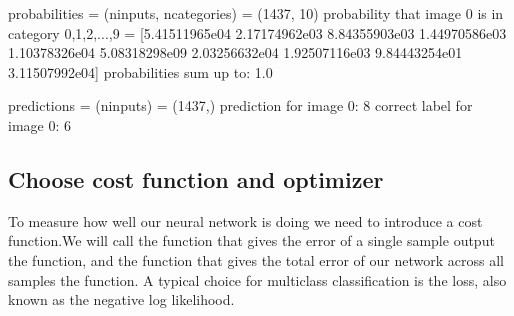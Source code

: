 \documentclass[letterpaper,10pt,english]{sphinxmanual}
\begin{document}
\begin{sphinxVerbatim}[commandchars=\\\{\}]
 
      
      

  
  
  \PYG{p}{[}\PYG{p}{]}
  \PYG{p}{[}\PYG{p}{]}
\end{sphinxVerbatim}

\begin{sphinxVerbatim}[commandchars=\\\{\}]
probabilities = (n\PYGZus{}inputs, n\PYGZus{}categories) = (1437, 10)
probability that image 0 is in category 0,1,2,...,9 = 
[5.41511965e\PYGZhy{}04 2.17174962e\PYGZhy{}03 8.84355903e\PYGZhy{}03 1.44970586e\PYGZhy{}03
 1.10378326e\PYGZhy{}04 5.08318298e\PYGZhy{}09 2.03256632e\PYGZhy{}04 1.92507116e\PYGZhy{}03
 9.84443254e\PYGZhy{}01 3.11507992e\PYGZhy{}04]
probabilities sum up to: 1.0

predictions = (n\PYGZus{}inputs) = (1437,)
prediction for image 0: 8
correct label for image 0: 6
\end{sphinxVerbatim}


\subsection{Choose cost function and optimizer}
\label{\detokenize{chapter6:choose-cost-function-and-optimizer}}
To measure how well our neural network is doing we need to introduce a cost function.We will call the function that gives the error of a single sample output the  function, and the function
that gives the total error of our network across all samples the  function.
A typical choice for multiclass classification is the  loss, also known as the negative log likelihood.
\end{document}
